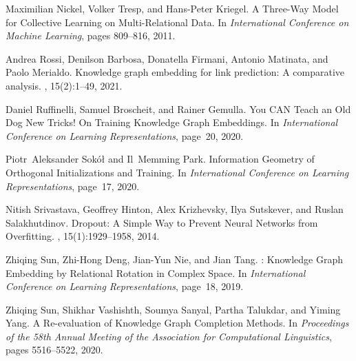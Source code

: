 \documentclass{article}
\theoremstyle{plain}
\theoremstyle{remark}
\begin{document}
\begin{thebibliography}{}
Maximilian Nickel, Volker Tresp, and Hans-Peter Kriegel.
\newblock A {{Three-Way Model}} for {{Collective Learning}} on
  {{Multi-Relational Data}}.
\newblock In {\em International {{Conference}} on {{Machine Learning}}}, pages
  809--816, 2011.

Andrea Rossi, Denilson Barbosa, Donatella Firmani, Antonio Matinata, and Paolo
  Merialdo.
\newblock Knowledge graph embedding for link prediction: {{A}} comparative
  analysis.
,
  15(2):1--49, 2021.

Daniel Ruffinelli, Samuel Broscheit, and Rainer Gemulla.
\newblock You {{CAN Teach}} an {{Old Dog New Tricks}}! {{On Training Knowledge
  Graph Embeddings}}.
\newblock In {\em International {{Conference}} on {{Learning
  Representations}}}, page~20, 2020.

Piotr~Aleksander Sok{\'o}{\l} and Il~Memming Park.
\newblock Information {{Geometry}} of {{Orthogonal Initializations}} and
  {{Training}}.
\newblock In {\em International {{Conference}} on {{Learning
  Representations}}}, page~17, 2020.

Nitish Srivastava, Geoffrey Hinton, Alex Krizhevsky, Ilya Sutskever, and Ruslan
  Salakhutdinov.
\newblock Dropout: {{A Simple Way}} to {{Prevent Neural Networks}} from
  {{Overfitting}}.
, 15(1):1929--1958,
  2014.

Zhiqing Sun, Zhi-Hong Deng, Jian-Yun Nie, and Jian Tang.
: {{Knowledge Graph Embedding}} by {{Relational Rotation}}
  in {{Complex Space}}.
\newblock In {\em International {{Conference}} on {{Learning
  Representations}}}, page~18, 2019.

Zhiqing Sun, Shikhar Vashishth, Soumya Sanyal, Partha Talukdar, and Yiming
  Yang.
\newblock A {{Re-evaluation}} of {{Knowledge Graph Completion Methods}}.
\newblock In {\em Proceedings of the 58th {{Annual Meeting}} of the
  {{Association}} for {{Computational Linguistics}}}, pages 5516--5522, 2020.


\end{thebibliography}
\end{document}
